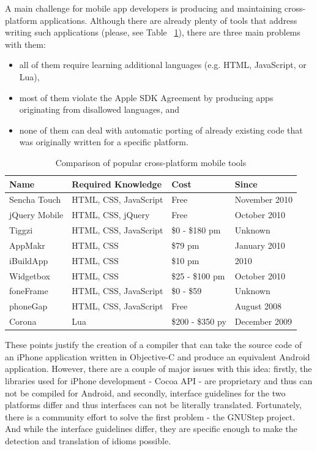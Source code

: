 \documentclass[parskip]{cs4rep}
\begin{document}
A main challenge for mobile app developers is producing and maintaining cross-platform applications. Although there are already plenty of tools that address writing such applications (please, see Table ~\ref{tab:crossPlatformTools}), there are three main problems with them:

\begin{itemize}
\item
all of them require learning additional languages (e.g. HTML, JavaScript, or
Lua),
\item
most of them violate the Apple SDK Agreement \cite{P5} \cite{P6} by
producing apps originating from disallowed languages, and
\item
none of them can deal with automatic porting of already existing code that was
originally written for a specific platform.
\end{itemize}

\begin{table}
    \label{tab:crossPlatformTools}
    \caption{Comparison of popular cross-platform mobile tools \cite{P4}}
    \centering
    \begin{tabular}{ | l | p{4.4cm} | p{2.6cm} | p{3cm} |}
    \hline
    Name & Required Knowledge & Cost & Since \\ \hline
    Sencha Touch & HTML, CSS, JavaScript & Free & November 2010 \\ \hline
    jQuery Mobile & HTML, CSS, jQuery & Free & October 2010 \\ \hline
    Tiggzi & HTML, CSS, JavaScript & \$0 - \$180 pm & Unknown \\ \hline
    AppMakr & HTML, CSS & \$79 pm & January 2010 \\ \hline
    iBuildApp & HTML, CSS & \$10 pm & 2010 \\ \hline
    Widgetbox & HTML, CSS & \$25 - \$100 pm & October 2010 \\ \hline
    foneFrame & HTML, CSS, JavaScript & \$0 - \$59 & Unknown \\ \hline
    phoneGap & HTML, CSS, JavaScript & Free & August 2008 \\ \hline
    Corona & Lua & \$200 - \$350 py & December 2009 \\ \hline
    \end{tabular}
\end{table}

These points justify the creation of a compiler that can take the source code of
an iPhone application written in Objective-C and produce an equivalent Android
application. However, there are a couple of major issues with this idea:
firstly, the libraries used for iPhone development - Cocoa API - are proprietary
and thus can not be compiled for Android, and secondly, interface guidelines for
the two platforms differ and thus interfaces can not be literally translated.
Fortunately, there is a community effort to solve the first problem - the
GNUStep project. And while the interface guidelines differ, they are
specific enough to make the detection and translation of idioms possible.
\end{document}
